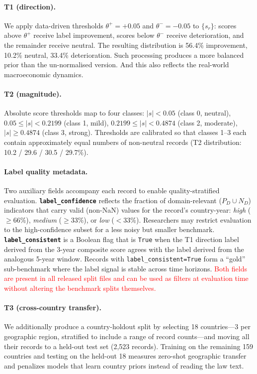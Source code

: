 \documentclass[11pt]{article}
\begin{document}
\paragraph{T1 (direction).}
We apply data-driven thresholds $\theta^{+}=+0.05$ and $\theta^{-}=-0.05$ to
$\{s_r\}$: scores above $\theta^{+}$ receive label \textsf{improvement},
scores below $\theta^{-}$ receive \textsf{deterioration}, and the remainder
receive \textsf{neutral}. The resulting distribution is 56.4\% improvement,
10.2\% neutral, 33.4\% deterioration. Such processing produces a more balanced prior than the
un-normalised version. And this also reflects the real-world macroeconomic dynamics.

\paragraph{T2 (magnitude).}
Absolute score thresholds map to four classes: $|s|<0.05$ (class 0, neutral),
$0.05 \le |s|<0.2199$ (class 1, mild), $0.2199 \le |s|<0.4874$ (class 2,
moderate), $|s|\ge0.4874$ (class 3, strong). Thresholds are calibrated
so that classes 1--3 each contain approximately equal numbers of non-neutral
records (T2 distribution: 10.2 / 29.6 / 30.5 / 29.7\%).

\paragraph{Label quality metadata.}
Two auxiliary fields accompany each record to enable quality-stratified evaluation.
\textbf{\texttt{label\_confidence}} reflects the fraction of domain-relevant ($P_D \cup N_D$)
indicators that carry valid (non-NaN) values for the record's country-year:
\textit{high} ($\ge$66\%), \textit{medium} ($\ge$33\%), or \textit{low} ($<$33\%).
Researchers may restrict evaluation to the high-confidence subset for a less noisy
but smaller benchmark.
\textbf{\texttt{label\_consistent}} is a Boolean flag that is \texttt{True} when
the T1 direction label derived from the 3-year composite score agrees with the
label derived from the analogous 5-year window. Records with \texttt{label\_consistent=True}
form a ``gold'' sub-benchmark where the label signal is stable across time horizons.
\textcolor{red}{Both fields are present in all released split files and can be used as filters at
evaluation time without altering the benchmark splits themselves.}

\paragraph{T3 (cross-country transfer).}
We additionally produce a country-holdout split by selecting 18 countries---3
per geographic region, stratified to include a range of record counts---and
moving all their records to a held-out test set (2{,}523 records). Training on
the remaining 159 countries and testing on the held-out 18 measures zero-shot
geographic transfer and penalizes models that learn country priors instead of
reading the law text.
\end{document}
